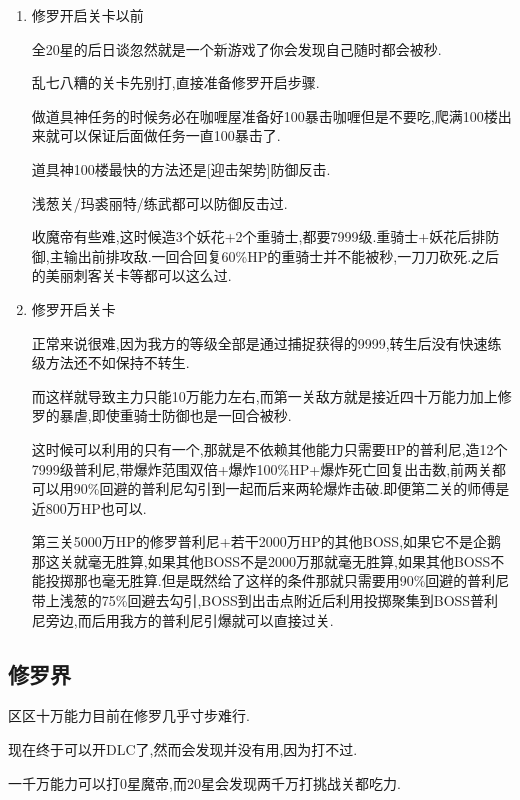		\begin{enumerate}
			\item{修罗开启关卡以前}

			全20星的后日谈忽然就是一个新游戏了你会发现自己随时都会被秒.

			乱七八糟的关卡先别打,直接准备修罗开启步骤.

			做道具神任务的时候务必在咖喱屋准备好100暴击咖喱但是不要吃,爬满100楼出来就可以保证后面做任务一直100暴击了.

			道具神100楼最快的方法还是[迎击架势]防御反击.

			浅葱关/玛裘丽特/练武都可以防御反击过.

			收魔帝有些难,这时候造3个妖花+2个重骑士,都要7999级.重骑士+妖花后排防御,主输出前排攻敌.一回合回复60\%HP的重骑士并不能被秒,一刀刀砍死.之后的美丽刺客关卡等都可以这么过.

			\item{修罗开启关卡}

			正常来说很难,因为我方的等级全部是通过捕捉获得的9999,转生后没有快速练级方法还不如保持不转生.

			而这样就导致主力只能10万能力左右,而第一关敌方就是接近四十万能力加上修罗的暴虐,即使重骑士防御也是一回合被秒.

			这时候可以利用的只有一个,那就是不依赖其他能力只需要HP的普利尼,造12个7999级普利尼,带爆炸范围双倍+爆炸100\%HP+爆炸死亡回复出击数,前两关都可以用90\%回避的普利尼勾引到一起而后来两轮爆炸击破.即便第二关的师傅是近800万HP也可以.

			第三关5000万HP的修罗普利尼+若干2000万HP的其他BOSS,如果它不是企鹅那这关就毫无胜算,如果其他BOSS不是2000万那就毫无胜算,如果其他BOSS不能投掷那也毫无胜算.但是既然给了这样的条件那就只需要用90\%回避的普利尼带上浅葱的75\%回避去勾引,BOSS到出击点附近后利用投掷聚集到BOSS普利尼旁边,而后用我方的普利尼引爆就可以直接过关.

		\end{enumerate}
		
		\subsection{修罗界}

		区区十万能力目前在修罗几乎寸步难行.

		现在终于可以开DLC了,然而会发现并没有用,因为打不过.

		一千万能力可以打0星魔帝,而20星会发现两千万打挑战关都吃力.

	
